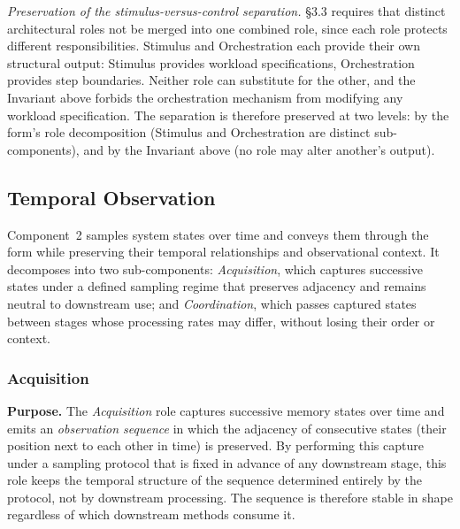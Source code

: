   \emph{Preservation of the stimulus-versus-control separation.} \S3.3 requires that distinct architectural roles not be merged into one combined role, since each role protects different responsibilities. Stimulus and Orchestration each provide their own structural output: Stimulus provides workload specifications, Orchestration provides step boundaries. Neither role can substitute for the other, and the Invariant above forbids the orchestration mechanism from modifying any workload specification. The separation is therefore preserved at two levels: by the form's role decomposition (Stimulus and Orchestration are distinct sub-components), and by the Invariant above (no role may alter another's output).



\subsection{Temporal Observation}\label{subsec:temp-obs}

Component~2 samples system states over time and conveys them through the form while preserving their temporal relationships and observational context. It decomposes into two sub-components: \emph{Acquisition}, which captures successive states under a defined sampling regime that preserves adjacency and remains neutral to downstream use; and \emph{Coordination}, which passes captured states between stages whose processing rates may differ, without losing their order or context.

  \subsubsection{Acquisition}\label{subsubsec:acquisition}
  \textbf{Purpose.} The \emph{Acquisition} role captures successive memory states over time and emits an \emph{observation sequence} in which the adjacency of consecutive states (their position next to each other in time) is preserved. By performing this capture under a sampling protocol that is fixed in advance of any downstream stage, this role keeps the temporal structure of the sequence determined entirely by the protocol, not by downstream processing. The sequence is therefore stable in shape regardless of which downstream methods consume it.

